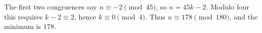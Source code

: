 The first two congruences say $n\equiv-2\pmod{45}$, so $n=45k-2$. Modulo four this requires $k-2\equiv2$, hence $k\equiv0\pmod4$. Thus $n\equiv178\pmod{180}$, and the minimum is $\boxed{178}$.
